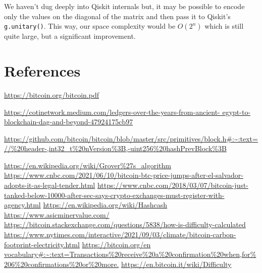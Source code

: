 \documentclass[11pt]{article} %
\begin{document}
\noindent We haven't dug deeply into Qiskit internals but, it may be possible to encode only the values on the diagonal of the matrix and then pass it to Qiskit's \lstinline{g.unitary()}. This way, our space complexity would be $O(2^n)$ which is still quite large, but a significant improvement.

\section{References}{}

\begin{thebibliography}{12}
\url{https://bitcoin.org/bitcoin.pdf}

 \url{https://cotinetwork.medium.com/ledgers-over-the-years-from-ancient-
egypt-to-blockchain-dag-and-beyond-47924175cb97}

 \url{https://github.com/bitcoin/bitcoin/blob/master/src/primitives/block.h#:~:text=//%20header-,int32_t%20nVersion%3B,-uint256%20hashPrevBlock%3B}

 \url{https://en.wikipedia.org/wiki/Grover%27s_algorithm}
  \url{https://www.cnbc.com/2021/06/10/bitcoin-btc-price-jumps-after-el-salvador-adopts-it-as-legal-tender.html}
 \url{https://www.cnbc.com/2018/03/07/bitcoin-just-tanked-below-10000-after-sec-says-crypto-exchanges-must-register-with-agency.html}
 \url{https://en.wikipedia.org/wiki/Hashcash}
 \url{https://www.asicminervalue.com/}
 \url{https://bitcoin.stackexchange.com/questions/5838/how-is-difficulty-calculated}
 \url{https://www.nytimes.com/interactive/2021/09/03/climate/bitcoin-carbon-footprint-electricity.html}
 \url{https://bitcoin.org/en vocabulary#:~:text=Transactions%20receive%20a%20confirmation%20when,for%206%20confirmations%20or%20more.}
 \url{https://en.bitcoin.it/wiki/Difficulty}

\end{thebibliography}
\end{document}
